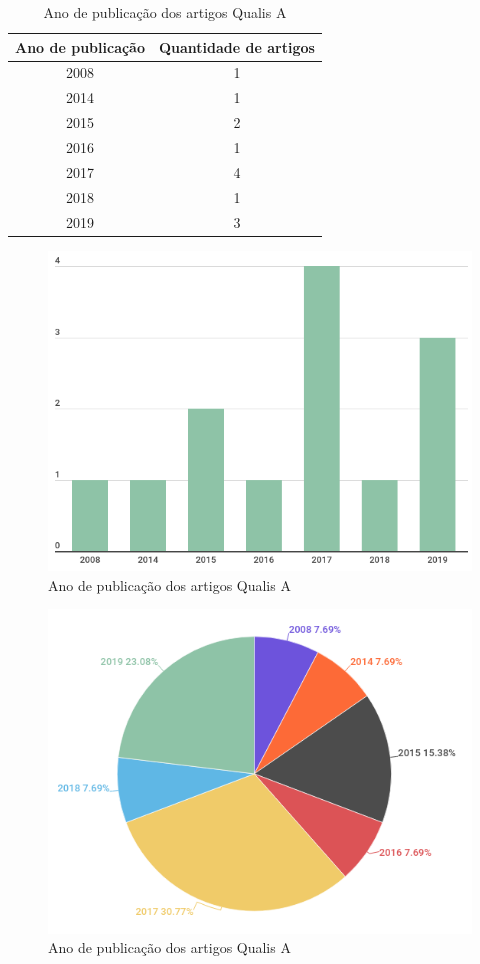 \documentclass[
article,			%
12pt,				%
oneside,			%
a4paper,			%
english,			%
brazil,				%
sumario=tradicional
]{abntex2}
\begin{document}
\begin{table}[!htb]
  \centering
  \caption{Ano de publicação dos artigos Qualis A}
  \begin{tabular}{|c|c|}
    \hline
    \textbf{Ano de publicação} & \textbf{Quantidade de artigos} \\ \hline
    2008 & 1 \\ \hline
    2014 & 1 \\ \hline
    2015 & 2 \\ \hline
    2016 & 1 \\ \hline
    2017 & 4 \\ \hline
    2018 & 1 \\ \hline
    2019 & 3 \\ \hline
  \end{tabular}
\end{table}

\begin{figure}[!htb]
  \centering
  \includegraphics[width=\textwidth]{artigosA.png}
  \caption{\label{fig:artigosA.png}Ano de publicação dos artigos Qualis A}
\end{figure}

\begin{figure}[!htb]
  \centering
  \includegraphics[width=\textwidth]{artigosA_pizza.png}
  \caption{\label{fig:artigosA_pizza.png}Ano de publicação dos artigos Qualis A}
\end{figure}
\end{document}
